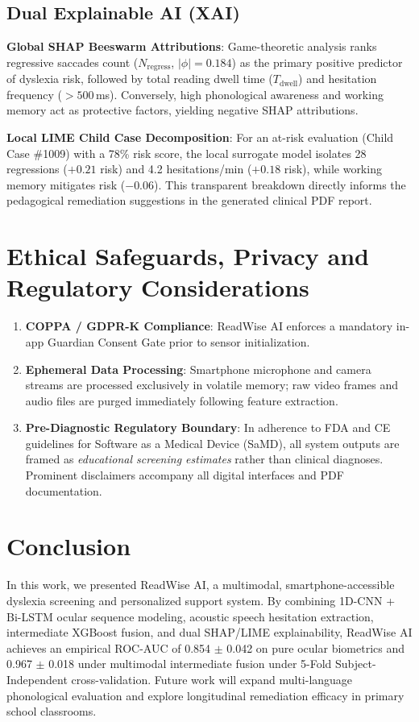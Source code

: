 \documentclass[conference]{IEEEtran}
\begin{document}
\subsection{Dual Explainable AI (XAI)}
\textbf{Global SHAP Beeswarm Attributions}: Game-theoretic analysis ranks regressive saccades count ($N_{\text{regress}}$, $|\phi| = 0.184$) as the primary positive predictor of dyslexia risk, followed by total reading dwell time ($T_{\text{dwell}}$) and hesitation frequency ($>500$\,ms). Conversely, high phonological awareness and working memory act as protective factors, yielding negative SHAP attributions.

\textbf{Local LIME Child Case Decomposition}: For an at-risk evaluation (Child Case \#1009) with a 78\% risk score, the local surrogate model isolates 28 regressions ($+0.21$ risk) and 4.2 hesitations/min ($+0.18$ risk), while working memory mitigates risk ($-0.06$). This transparent breakdown directly informs the pedagogical remediation suggestions in the generated clinical PDF report.

\section{Ethical Safeguards, Privacy and Regulatory Considerations}
\begin{enumerate}
    \item \textbf{COPPA / GDPR-K Compliance}: ReadWise AI enforces a mandatory in-app Guardian Consent Gate prior to sensor initialization.
    \item \textbf{Ephemeral Data Processing}: Smartphone microphone and camera streams are processed exclusively in volatile memory; raw video frames and audio files are purged immediately following feature extraction.
    \item \textbf{Pre-Diagnostic Regulatory Boundary}: In adherence to FDA and CE guidelines for Software as a Medical Device (SaMD), all system outputs are framed as \textit{educational screening estimates} rather than clinical diagnoses. Prominent disclaimers accompany all digital interfaces and PDF documentation.
\end{enumerate}

\section{Conclusion}
In this work, we presented ReadWise AI, a multimodal, smartphone-accessible dyslexia screening and personalized support system. By combining 1D-CNN + Bi-LSTM ocular sequence modeling, acoustic speech hesitation extraction, intermediate XGBoost fusion, and dual SHAP/LIME explainability, ReadWise AI achieves an empirical ROC-AUC of 0.854 $\pm$ 0.042 on pure ocular biometrics and 0.967 $\pm$ 0.018 under multimodal intermediate fusion under 5-Fold Subject-Independent cross-validation. Future work will expand multi-language phonological evaluation and explore longitudinal remediation efficacy in primary school classrooms.
\end{document}
